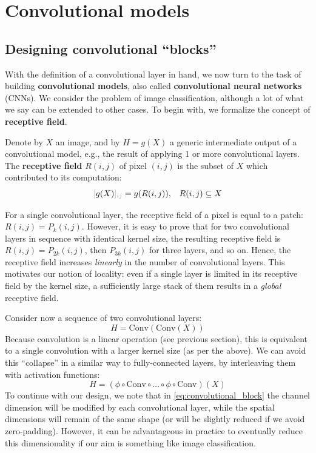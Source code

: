 \section{Convolutional models}

\subsection{Designing convolutional “blocks”}

With the definition of a convolutional layer in hand, we now turn to the task of building \textbf{convolutional models}, also called \textbf{convolutional neural networks} (CNNs). We consider the problem of image classification, although a lot of what we say can be extended to other cases. To begin with, we formalize the concept of \textbf{receptive field}.

\begin{definition}
Denote by $X$ an image, and by $H = g(X)$ a generic intermediate output of a convolutional model, e.g., the result of applying 1 or more convolutional layers. The \textbf{receptive field} $R(i,j)$ of pixel $(i,j)$ is the subset of $X$ which contributed to its computation:
$$
 \idx{g(X)}{ij} = g(R(i,j)), \;\;\; R(i,j) \subseteq X
$$
%
\end{definition}

For a single convolutional layer, the receptive field of a pixel is equal to a patch: $R(i,j) = P_{k}(i,j)$. However, it is easy to prove that for two convolutional layers in sequence with identical kernel size, the resulting receptive field is $R(i,j) = P_{2k}(i,j)$, then $P_{3k}(i,j)$ for three layers, and so on. Hence, the receptive field increases \textit{linearly} in the number of convolutional layers. This motivates our notion of locality: even if a single layer is limited in its receptive field by the kernel size, a sufficiently large stack of them results in a \textit{global} receptive field.

Consider now a sequence of two convolutional layers:
%
$$
H=\text{Conv}(\text{Conv}(X))
$$
%
Because convolution is a linear operation (see previous section), this is equivalent to a single convolution with a larger kernel size (as per the above). We can avoid this “collapse” in a similar way to fully-connected layers, by interleaving them with activation functions:
%
\begin{equation}
H = (\phi \circ \text{Conv}\circ\ldots\circ\phi\circ\text{Conv})(X)
\label{eq:convolutional_block}
\end{equation}
%
To continue with our design, we note that in \eqref{eq:convolutional_block} the channel dimension will be modified by each convolutional layer, while the spatial dimensions will remain of the same shape (or will be slightly reduced if we avoid zero-padding). However, it can be advantageous in practice to eventually reduce this dimensionality if our aim is something like image classification.

